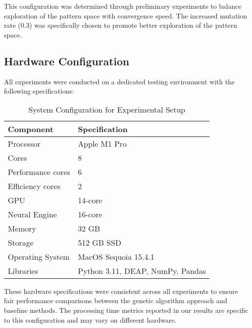 \documentclass[conference]{IEEEtran}
\begin{document}
This configuration was determined through preliminary experiments to balance exploration of the pattern space with convergence speed. The increased mutation rate (0.3) was specifically chosen to promote better exploration of the pattern space.

\subsection{\textbf{Hardware Configuration}}
All experiments were conducted on a dedicated testing environment with the following specifications:

\begin{table}[htbp]
\caption{System Configuration for Experimental Setup}
\centering
\renewcommand{\arraystretch}{2.5}
\begin{tabular}{|l|l|}
\hline
\textbf{Component} & \textbf{Specification} \\
\hline
Processor & Apple M1 Pro \\
Cores & 8 \\
Performance cores & 6 \\
Efficiency cores & 2 \\
GPU & 14-core \\
Neural Engine & 16-core  \\
Memory & 32 GB \\
Storage & 512 GB SSD \\
Operating System & MacOS Sequoia 15.4.1 \\
Libraries & Python 3.11, DEAP, NumPy, Pandas \\
\hline
\end{tabular}
\label{tab:system-specs}
\end{table}

These hardware specifications were consistent across all experiments to ensure fair performance comparisons between the genetic algorithm approach and baseline methods. The processing time metrics reported in our results are specific to this configuration and may vary on different hardware.
\end{document}
